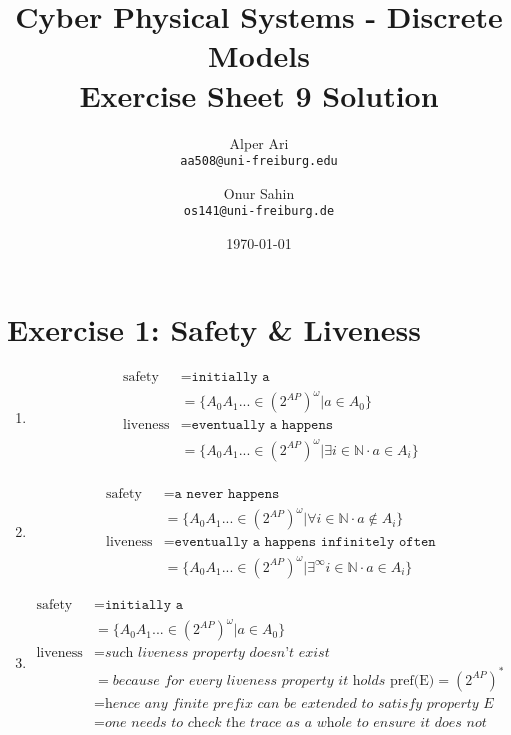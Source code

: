 \documentclass{article}
\title{
Cyber Physical Systems - Discrete Models \\
[0.2em]Exercise Sheet 9 Solution
}
\author{
  Alper Ari\\
  \texttt{aa508@uni-freiburg.edu}
  \and
  Onur Sahin\\
  \texttt{os141@uni-freiburg.de}
}
\date{\today}
\newcommand{\N}{\mathbb{N}}
\begin{document}
\maketitle

\section*{Exercise 1:  Safety \& Liveness}

\begin{enumerate}[a]
    \item
    \begin{equation*}
        \begin{split}
            \text{safety} &= \texttt{initially a}\\
            &= \{ A_0 A_1 ... \in (2^{AP})^\omega | a \in A_0 \} \\
            \text{liveness} &= \texttt{eventually a happens} \\
            &= \{ A_0 A_1 ... \in (2^{AP})^\omega | \exists i \in \N \cdot a \in A_i \} \\
        \end{split}
    \end{equation*}

    \item
    \begin{equation*}
        \begin{split}
            \text{safety} &= \texttt{a never happens}\\
            &= \{ A_0 A_1 ... \in (2^{AP})^\omega | \forall i \in \N \cdot a \notin A_i \} \\
            \text{liveness} &= \texttt{eventually a happens infinitely often} \\
            &= \{ A_0 A_1 ... \in (2^{AP})^\omega | \exists ^\infty i \in \N \cdot a \in A_i \}
        \end{split}
    \end{equation*}

    \item
    \begin{equation*}
        \begin{split}
            \text{safety} &= \texttt{initially a}\\
            &= \{ A_0 A_1 ... \in (2^{AP})^\omega | a \in A_0 \} \\
            \text{liveness} &= \textit{such liveness property doesn't exist} \\
            &= \textit{because for every liveness property it holds } \text{pref(E)}=(2^{AP})^*\\
            &= \textit{hence any finite prefix can be extended to satisfy property E} \\
            &= \textit{one needs to check the trace as a whole to ensure it does not satisfy E}
        \end{split}
    \end{equation*}


\end{enumerate}
\end{document}
